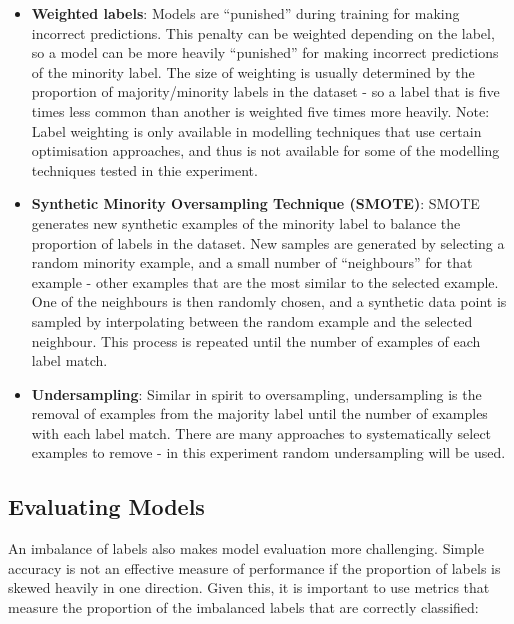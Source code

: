 \begin{itemize}
    \item \textbf{Weighted labels}: Models are ``punished'' during training for making incorrect predictions. This penalty can be weighted depending on the label, so a model can be more heavily ``punished'' for making incorrect predictions of the minority label. The size of weighting is usually determined by the proportion of majority/minority labels in the dataset - so a label that is five times less common than another is weighted five times more heavily. Note: Label weighting is only available in modelling techniques that use certain optimisation approaches, and thus is not available for some of the modelling techniques tested in thie experiment.
    \item \textbf{Synthetic Minority Oversampling Technique (SMOTE)}: SMOTE \cite{smote} generates new synthetic examples of the minority label to balance the proportion of labels in the dataset. New samples are generated by selecting a random minority example, and a small number of ``neighbours'' for that example - other examples that are the most similar to the selected example. One of the neighbours is then randomly chosen, and a synthetic data point is sampled by interpolating between the random example and the selected neighbour. This process is repeated until the number of examples of each label match.
    \item \textbf{Undersampling}: Similar in spirit to oversampling, undersampling is the removal of examples from the majority label until the number of examples with each label match. There are many approaches to systematically select examples to remove - in this experiment random undersampling will be used.
\end{itemize}

\subsection{Evaluating Models}\label{subsec:evaluating-models}

An imbalance of labels also makes model evaluation more challenging. Simple accuracy is not an effective measure of performance if the proportion of labels is skewed heavily in one direction. Given this, it is important to use metrics that measure the proportion of the imbalanced labels that are correctly classified:

